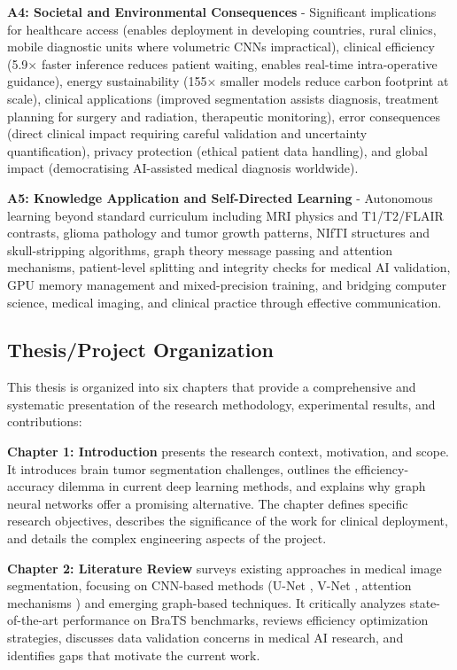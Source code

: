 \documentclass{article}
\begin{document}
\textbf{A4: Societal and Environmental Consequences} - Significant implications for healthcare access (enables deployment in developing countries, rural clinics, mobile diagnostic units where volumetric CNNs impractical), clinical efficiency (5.9$\times$ faster inference reduces patient waiting, enables real-time intra-operative guidance), energy sustainability (155$\times$ smaller models reduce carbon footprint at scale), clinical applications (improved segmentation assists diagnosis, treatment planning for surgery and radiation, therapeutic monitoring), error consequences (direct clinical impact requiring careful validation and uncertainty quantification), privacy protection (ethical patient data handling), and global impact (democratising AI-assisted medical diagnosis worldwide).

\textbf{A5: Knowledge Application and Self-Directed Learning} - Autonomous learning beyond standard curriculum including MRI physics and T1/T2/FLAIR contrasts, glioma pathology and tumor growth patterns, NIfTI structures and skull-stripping algorithms, graph theory message passing and attention mechanisms, patient-level splitting and integrity checks for medical AI validation, GPU memory management and mixed-precision training, and bridging computer science, medical imaging, and clinical practice through effective communication.

 
\subsection{Thesis/Project Organization}

This thesis is organized into six chapters that provide a comprehensive and systematic presentation of the research methodology, experimental results, and contributions:

\textbf{Chapter 1: Introduction} presents the research context, motivation, and scope. It introduces brain tumor segmentation challenges, outlines the efficiency-accuracy dilemma in current deep learning methods, and explains why graph neural networks offer a promising alternative. The chapter defines specific research objectives, describes the significance of the work for clinical deployment, and details the complex engineering aspects of the project.

\textbf{Chapter 2: Literature Review} surveys existing approaches in medical image segmentation, focusing on CNN-based methods (U-Net \cite{ronneberger2015unet}, V-Net \cite{milletari2016vnet}, attention mechanisms \cite{oktay2018attention}) and emerging graph-based techniques. It critically analyzes state-of-the-art performance on BraTS benchmarks, reviews efficiency optimization strategies, discusses data validation concerns in medical AI research, and identifies gaps that motivate the current work.
\end{document}
